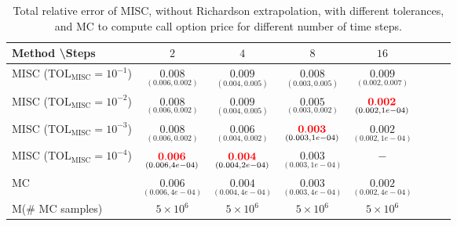 \begin{table}[h!]
	\centering
	\begin{tabular}{l*{6}{c}r}
		Method \textbackslash  Steps            & $2$ & $4$ & $8$ & $16$  \\
		\hline

		MISC ($\text{TOL}_{\text{MISC}}=10^{-1}$)  &  $\underset{(0.006,0.002)}{\mathbf{0.008}}$ & $\underset{(0.004,0.005)}{\mathbf{0.009}}$& $\underset{(0.003,0.005)}{\mathbf{ 0.008}}$ & $\underset{(0.002,0.007)}{\mathbf{ 0.009}}$   \\

		MISC ($\text{TOL}_{\text{MISC}}=10^{-2}$)  &  $\underset{(0.006,0.002)}{\mathbf{0.008}}$ & $\underset{(0.004,0.005)}{\mathbf{0.009}}$& $\underset{(0.003,0.002)}{\mathbf{ 0.005}}$ & $\underset{(0.002,1e-04)}{\mathbf{ {\color{red}0.002}}}$  \\
		MISC ($\text{TOL}_{\text{MISC}}=10^{-3}$)  &  $\underset{(0.006,0.002)}{\mathbf{0.008}}$& $\underset{(0.004,0.002)}{\mathbf{0.006}}$& $\underset{(0.003,1e-04)}{\mathbf{{\color{red}0.003}}}$  & $\underset{(0.002,1e-04)}{\mathbf{ 0.002}}$  \\
		MISC ($\text{TOL}_{\text{MISC}}=10^{-4}$)  &  $\underset{(0.006,4e-04)}{\mathbf{{\color{red}0.006}}}$ & $\underset{(0.004,2e-04)}{\mathbf{{\color{red}0.004}}}$& $\underset{(0.003,1e-04)}{\mathbf{0.003}}$ & $\mathbf{ -}$ \\

		
		\hline
		MC    & $\underset{(0.006,4e-04)}{\mathbf{0.006}}$  & $\underset{(0.004,4e-04)}{ \mathbf{0.004}}$  & $\underset{(0.003,4e-04)}{\mathbf{0.003}}$ & $\underset{(0.002,4e-04)}{\mathbf{0.002}}$  \\	
		M(\# MC samples) 	& $5 \times 10^6$  & $5 \times 10^6$  & $5 \times 10^6$ & $5 \times 10^6$  \\
		\hline
	\end{tabular}
	\caption{Total relative error of MISC, without Richardson extrapolation, with different tolerances, and MC to compute call option price  for different number of time steps.}
	\label{Total error of MISC and MC to compute Call option price of the different tolerances for different number of time steps. Case set 4, without Richardson extrapolation. The numbers between parentheses are the corresponding absolute errors.}
\end{table}

